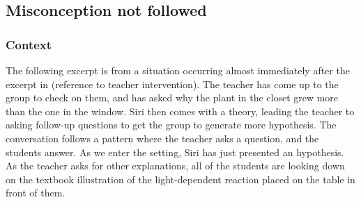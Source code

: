 \subsection{Misconception not followed}

\subsubsection*{Context}
The following excerpt is from a situation occurring almost immediately after the excerpt in (reference to teacher intervention). The teacher has come up to the group to check on them, and has asked why the plant in the closet grew more than the one in the window. Siri then comes with a theory, leading the teacher to asking follow-up questions to get the group to generate more hypothesis. The conversation follows a pattern where the teacher asks a question, and the students answer. As we enter the setting, Siri has just presented an hypothesis. As the teacher asks for other explanations, all of the students are looking down on the textbook illustration of the light-dependent reaction placed on the table in front of them. 

